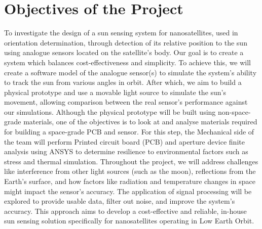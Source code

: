 \section{Objectives of the Project}
To investigate the design of a sun sensing system for nanosatellites, used in orientation determination, through detection of its relative position to the sun using analogue sensors located on the satellite's body. Our goal is to create a system which balances cost-effectiveness and simplicity.
To achieve this, we will create a software model of the analogue sensor(s) to simulate the system's ability to track the sun from various angles in orbit. After which, we aim to build a physical prototype and use a movable light source to simulate the sun's movement, allowing comparison between the real sensor's performance against our simulations.
Although the physical prototype will be built using non-space-grade materials, one of the objectives is to look at and analyse materials required for building a space-grade PCB and sensor. For this step, the Mechanical side of the team will perform Printed circuit board (PCB) and aperture device finite analysis using ANSYS to determine resilience to environmental factors such as stress and thermal simulation.
Throughout the project, we will address challenges like interference from other light sources (such as the moon), reflections from the Earth's surface, and how factors like radiation and temperature changes in space might impact the sensor's accuracy. The application of signal processing will be explored to provide usable data, filter out noise, and improve the system's accuracy.
This approach aims to develop a cost-effective and reliable, in-house sun sensing solution specifically for nanosatellites operating in Low Earth Orbit.
